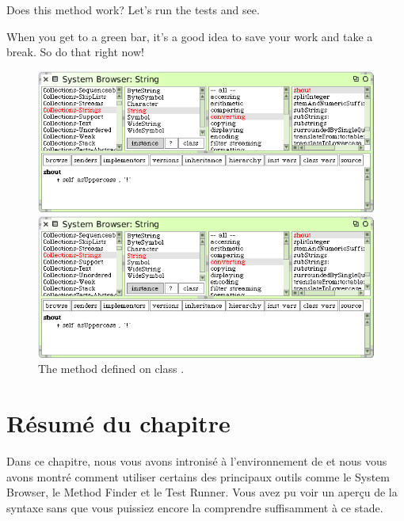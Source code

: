 \documentclass[a4paper,10pt,twoside]{book}
\begin{document}
Does this method work?  Let's run the tests and see.

When you get to a green bar\footnotemark, it's a good idea to save your work and take a break.  
So do that right now!

\begin{figure}[hbt]
\ifluluelse
	{\centerline{\includegraphics[width=\textwidth]{String-Shout}}}
	{\centerline{\includegraphics[scale=0.7]{String-Shout}}}
\caption{The  method defined on class .
\label{fig:String-shout}}
\end{figure}

\section{R\'esum\'e du chapitre}
Dans ce chapitre, nous vous avons intronis\'e \`a l'environnement de
\sq et nous vous avons montr\'e comment utiliser certains des
principaux outils comme le  System Browser, le
Method Finder et le Test Runner. Vous avez pu voir un aper\c{c}u de la
syntaxe sans que vous puissiez encore la comprendre suffisamment \`a ce stade.
\end{document}
